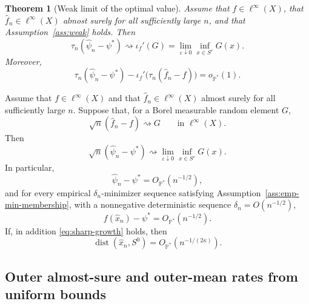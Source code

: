 \documentclass[11pt]{article}
\newtheorem{theorem}{Theorem}[section]
\begin{document}
\begin{theorem}[Weak limit of the optimal value]\label{thm:weakvalue}
Assume that $f\in\ell^{\infty}(X)$, that $\hat{f}_{n}\in\ell^{\infty}(X)$
almost surely for all sufficiently large $n$, and that Assumption~\ref{ass:weak}
holds. Then 
\begin{equation}
\tau_{n}(\hat{\psi}_{n}-\psi^{*})\rightsquigarrow\iota_{f}'(G)=\lim_{\varepsilon\downarrow0}\inf_{x\in S^{\varepsilon}}G(x).\label{eq:weak-value}
\end{equation}
Moreover, 
\begin{equation}
\tau_{n}(\hat{\psi}_{n}-\psi^{*})-\iota_{f}'\bigl(\tau_{n}(\hat{f}_{n}-f)\bigr)=o_{\mathbb{P}^{*}}(1).\label{eq:weak-linearization}
\end{equation}
\end{theorem} 
\begin{corollary}\label{cor:donsker}
Assume that $f\in\ell^{\infty}(X)$ and that $\hat{f}_{n}\in\ell^{\infty}(X)$
almost surely for all sufficiently large $n$. Suppose that, for a Borel measurable
random element $G$,
\[
\sqrt{n}(\hat{f}_{n}-f)\rightsquigarrow G\qquad\text{in }\ell^{\infty}(X).
\]
Then 
\begin{equation}
\sqrt{n}(\hat{\psi}_{n}-\psi^{*})\rightsquigarrow\lim_{\varepsilon\downarrow0}\inf_{x\in S^{\varepsilon}}G(x).\label{eq:sqrt-value-limit}
\end{equation}
In particular, 
\begin{equation}
\hat{\psi}_{n}-\psi^{*}=O_{\mathbb{P}^{*}}(n^{-1/2}),\label{eq:sqrt-rate}
\end{equation}
and for every empirical $\delta_{n}$-minimizer sequence satisfying
Assumption~\ref{ass:emp-min-membership}, with a nonnegative
deterministic sequence $\delta_{n}=O(n^{-1/2})$, 
\begin{equation}
f(\hat{x}_{n})-\psi^{*}=O_{\mathbb{P}^{*}}(n^{-1/2}).\label{eq:sqrt-excess}
\end{equation}
If, in addition \eqref{eq:sharp-growth} holds, then 
\begin{equation}
\operatorname{dist}(\hat{x}_{n},S^{0})=O_{\mathbb{P}^{*}}(n^{-1/(2\kappa)}).\label{eq:sqrt-distance}
\end{equation}
\end{corollary}

\subsection{Outer almost-sure and outer-mean rates from uniform bounds}
\end{document}

